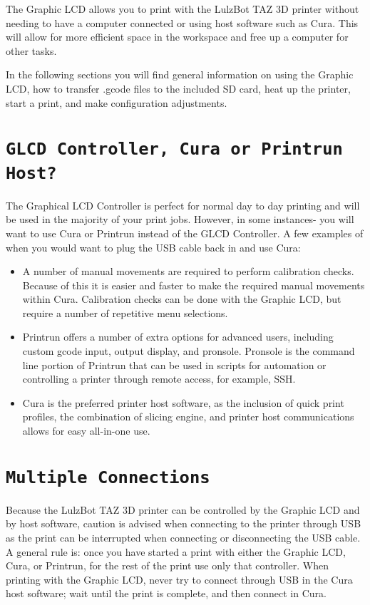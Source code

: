 %
%
%
%
%

The Graphic LCD allows you to print with the LulzBot\textsuperscript{\miniscule{\texttrademark}} TAZ 3D printer without needing to have a computer connected or using host software such as Cura. This will allow for more efficient space in the workspace and free up a computer for other tasks.

In the following sections you will find general information on using the Graphic LCD, how to transfer .gcode files to the included SD card, heat up the printer, start a print, and make configuration adjustments.

\section{\texttt{GLCD Controller, Cura or Printrun Host?}}
\label{sec:Graphic LCD, Cura or Printrun Host?}
The Graphical LCD Controller is perfect for normal day to day printing and will be used in the majority of your print jobs. However, in some instances- you will want to use Cura or Printrun instead of the GLCD Controller. A few examples of when you would want to plug the USB cable back in and use Cura:
\begin{itemize}
	\item A number of manual movements are required to perform calibration checks. Because of this it is easier and faster to make the required manual movements within Cura. Calibration checks can be done with the Graphic LCD, but require a number of repetitive menu selections.
	\item Printrun offers a number of extra options for advanced users, including custom gcode input, output display, and pronsole. Pronsole is the command line portion of Printrun that can be used in scripts for automation or controlling a printer through remote access, for example, SSH.
	\item Cura is the preferred printer host software, as the inclusion of quick print profiles, the combination of slicing engine, and printer host communications allows for easy all-in-one use.
\end{itemize}

\section{\texttt{Multiple Connections}}
Because the LulzBot\textsuperscript{\miniscule{\texttrademark}} TAZ 3D printer can be controlled by the Graphic LCD and by host software, caution is advised when connecting to the printer through USB as the print can be interrupted when connecting or disconnecting the USB cable. A general rule is: once you have started a print with either the Graphic LCD, Cura, or Printrun, for the rest of the print use only that controller. When printing with the Graphic LCD, never try to connect through USB in the Cura host software; wait until the print is complete, and then connect in Cura.

